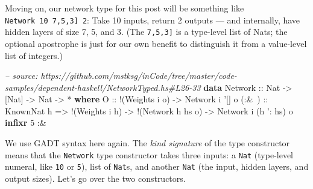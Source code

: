 \documentclass[]{article}
\newenvironment{Shaded}{}{}
\newcommand{\KeywordTok}[1]{\textcolor[rgb]{0.00,0.44,0.13}{\textbf{{#1}}}}
\newcommand{\DataTypeTok}[1]{\textcolor[rgb]{0.56,0.13,0.00}{{#1}}}
\newcommand{\DecValTok}[1]{\textcolor[rgb]{0.25,0.63,0.44}{{#1}}}
\newcommand{\CharTok}[1]{\textcolor[rgb]{0.25,0.44,0.63}{{#1}}}
\newcommand{\CommentTok}[1]{\textcolor[rgb]{0.38,0.63,0.69}{\textit{{#1}}}}
\newcommand{\OtherTok}[1]{\textcolor[rgb]{0.00,0.44,0.13}{{#1}}}
\newcommand{\FunctionTok}[1]{\textcolor[rgb]{0.02,0.16,0.49}{{#1}}}
\newcommand{\NormalTok}[1]{{#1}}
\begin{document}
Moving on, our network type for this post will be something like
\texttt{Network\ 10\ \textquotesingle{}{[}7,5,3{]}\ 2}: Take 10 inputs, return 2
outputs --- and internally, have hidden layers of size 7, 5, and 3. (The
\texttt{\textquotesingle{}{[}7,5,3{]}} is a type-level list of Nats; the
optional \texttt{\textquotesingle{}} apostrophe is just for our own benefit to
distinguish it from a value-level list of integers.)

\begin{Shaded}
\begin{Highlighting}[]
\CommentTok{-- source: https://github.com/mstksg/inCode/tree/master/code-samples/dependent-haskell/NetworkTyped.hs#L26-33}
\KeywordTok{data} \DataTypeTok{Network}\OtherTok{ ::} \DataTypeTok{Nat} \OtherTok{->} \NormalTok{[}\DataTypeTok{Nat}\NormalTok{] }\OtherTok{->} \DataTypeTok{Nat} \OtherTok{->} \FunctionTok{*} \KeywordTok{where}
    \DataTypeTok{O}\OtherTok{     ::} \FunctionTok{!}\NormalTok{(}\DataTypeTok{Weights} \NormalTok{i o)}
          \OtherTok{->} \DataTypeTok{Network} \NormalTok{i }\CharTok{'[] o}
\OtherTok{    (:&~) ::} \DataTypeTok{KnownNat} \NormalTok{h}
          \OtherTok{=>} \FunctionTok{!}\NormalTok{(}\DataTypeTok{Weights} \NormalTok{i h)}
          \OtherTok{->} \FunctionTok{!}\NormalTok{(}\DataTypeTok{Network} \NormalTok{h hs o)}
          \OtherTok{->} \DataTypeTok{Network} \NormalTok{i (h }\CharTok{': hs) o}
\KeywordTok{infixr} \DecValTok{5} \FunctionTok{:&~}
\end{Highlighting}
\end{Shaded}

We use GADT syntax here again. The \emph{kind signature} of the type constructor
means that the \texttt{Network} type constructor takes three inputs: a
\texttt{Nat} (type-level numeral, like \texttt{10} or \texttt{5}), list of
\texttt{Nat}s, and another \texttt{Nat} (the input, hidden layers, and output
sizes). Let's go over the two constructors.
\end{document}
